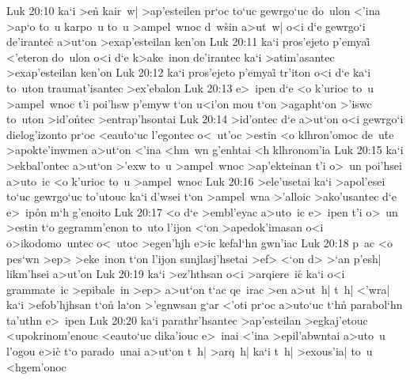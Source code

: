 \vs Luk 20:10
ka`i
>e\r{n}
kair~w|
>ap'esteilen
pr`oc
to`uc
gewrgo`uc
do~ulon
<'ina
>ap`o
to~u
karpo~u
to~u
>ampel~wnoc
d~w\r{s}in
a>ut~w|
o<i
d`e
gewrgo`i
de'irantec\r{}
a>ut`on
>exap'esteilan
ken'on\bibvsend
\vs Luk 20:11
ka`i
pros'ejeto
p'emyai\r{}
<'eteron
do~ulon
o<i
d`e
k>ake~inon
de'irantec
ka`i
>atim'asantec
>exap'esteilan
ken'on\bibvsend
\vs Luk 20:12
ka`i
pros'ejeto
p'emyai\r{}
tr'iton
o<i
d`e
ka`i
to~uton
traumat'isantec
>ex'ebalon\bibvsend
\vs Luk 20:13
e>~ipen
d`e
<o
k'urioc
to~u
>ampel~wnoc
t'i
poi'hsw
p'emyw
t`on
u<i'on
mou
t`on
>agapht`on
>'iswc
to~uton
>id'o\r{n}tec
>entrap'hsontai\bibvsend
\vs Luk 20:14
>id'ontec
d`e
a>ut`on
o<i
gewrgo`i
dielog'izonto
pr`oc
<eau\r{t}o`uc
l'egontec
o<~ut'oc
>estin
<o
klhron'omoc
de~u\r{t}e
>apokte'inwmen
a>ut`on
<'ina
<hm~wn
g'enhtai
<h
klhronom'ia\bibvsend
\vs Luk 20:15
ka`i
>ekbal'ontec
a>ut`on
>'exw
to~u
>ampel~wnoc
>ap'ekteinan
t'i
o>~un
poi'hsei
a>uto~ic
<o
k'urioc
to~u
>ampel~wnoc\bibvsend
\vs Luk 20:16
>ele'usetai
ka`i
>apol'esei
to`uc
gewrgo`uc
to'utouc
ka`i
d'wsei
t`on
>ampel~wna
>'alloic
>ako'usantec
d`e
e>~ip\r{o}n
m`h
g'enoito\bibvsend
\vs Luk 20:17
<o
d`e
>embl'eyac
a>uto~ic
e>~ipen
t'i
o>~un
>estin
t`o
gegramm'enon
to~uto
l'ijon
<`on
>apedok'imasan
o<i
o>ikodomo~untec
o<~utoc
>egen'hjh
e>ic
kefal`hn
gwn'iac\bibvsend
\vs Luk 20:18
p~ac
<o
pes`wn
>ep>
>eke~inon
t`on
l'ijon
sunjlasj'hsetai
>ef>
<`on
d>
>`an
p'esh|
likm'hsei
a>ut'on\bibvsend
\vs Luk 20:19
ka`i
>ez'hthsan
o<i
>arqiere~ic\r{}
ka`i
o<i
grammate~ic
>epibale~in
>ep>
a>ut`on
t`ac
qe~irac
>en
a>ut~h|
t~h|
<'wra|
ka`i
>efob'hjhsan
t`on\r{}
la`on
>'egnwsan
g`ar
<'oti
pr`oc
a>uto`uc
t`hn\r{}
parabol`hn
ta'uthn
e>~ipen\bibvsend
\vs Luk 20:20
ka`i
parathr'hsantec
>ap'esteilan
>egkaj'etouc
<upokrinom'enouc
<eauto`uc
dika'iouc
e>~inai
<'ina
>epil'abwntai
a>uto~u
l'ogou
e>ic\r{}
t`o
parado~unai
a>ut`on
t~h|
>arq~h|
ka`i
t~h|
>exous'ia|
to~u
<hgem'onoc\bibvsend
